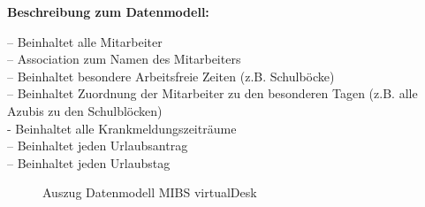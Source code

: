 \textbf{Beschreibung zum Datenmodell:}

 – Beinhaltet alle Mitarbeiter\\
 – Association zum Namen des Mitarbeiters\\
 – Beinhaltet besondere Arbeitsfreie Zeiten (z.B. Schulböcke)\\
 – Beinhaltet Zuordnung der Mitarbeiter zu den besonderen Tagen (z.B. alle Azubis zu den Schulblöcken)\\
 - Beinhaltet alle Krankmeldungszeiträume\\
 – Beinhaltet jeden Urlaubsantrag\\
 – Beinhaltet jeden Urlaubstag\\

\begin{figure}[htb]
\centering
{}
\caption{Auszug Datenmodell MIBS virtualDesk}
\label{fig:Auszug Datenmodell MIBS virtualDesk}
\end{figure}